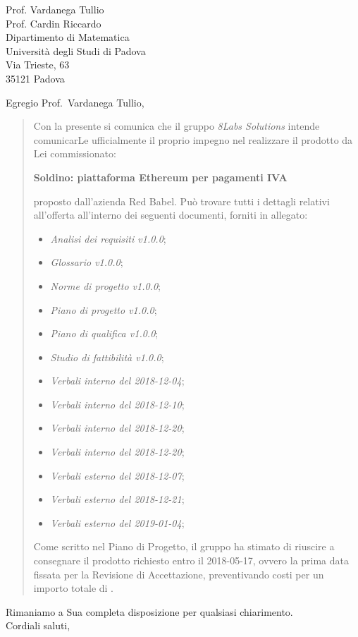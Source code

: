 \begin{letter}{
		Prof. Vardanega Tullio \\
		Prof. Cardin Riccardo \\
		Dipartimento di Matematica \\
		Università degli Studi di Padova \\
		Via Trieste, 63 \\
		35121 Padova}
		
\opening{Egregio Prof.~Vardanega Tullio,}

\begin{quotation}
Con la presente si comunica che il gruppo \textit{8Labs Solutions} intende 
comunicarLe ufficialmente il proprio impegno nel realizzare il prodotto da Lei 
commissionato:

\begin{center}
	\textbf{Soldino: piattaforma Ethereum per pagamenti IVA}
\end{center}

\noindent proposto dall'azienda Red Babel.
Può trovare tutti i dettagli relativi all'offerta all'interno dei seguenti 
documenti, forniti in allegato:

\begin{itemize}
	\item \textit{Analisi dei requisiti v1.0.0};
	
	\item \textit{Glossario v1.0.0};
	
	\item \textit{Norme di progetto v1.0.0};

	\item \textit{Piano di progetto v1.0.0};

	\item \textit{Piano di qualifica v1.0.0};

	\item \textit{Studio di fattibilità v1.0.0};

	\item \textit{Verbali interno del 2018-12-04};
	\item \textit{Verbali interno del 2018-12-10};
	\item \textit{Verbali interno del 2018-12-20};
	\item \textit{Verbali interno del 2018-12-20};
	
	\item \textit{Verbali esterno del 2018-12-07};
	\item \textit{Verbali esterno del 2018-12-21};
	\item \textit{Verbali esterno del 2019-01-04};
\end{itemize}

\noindent Come scritto nel Piano di Progetto, il gruppo ha stimato di riuscire a 
consegnare il prodotto richiesto entro il 2018-05-17, ovvero la prima data 
fissata per la Revisione di Accettazione, preventivando costi per un importo 
totale di .
\end{quotation}

\closing{Rimaniamo a Sua completa disposizione per qualsiasi chiarimento. \\
		Cordiali saluti, }
		
\end{letter}


